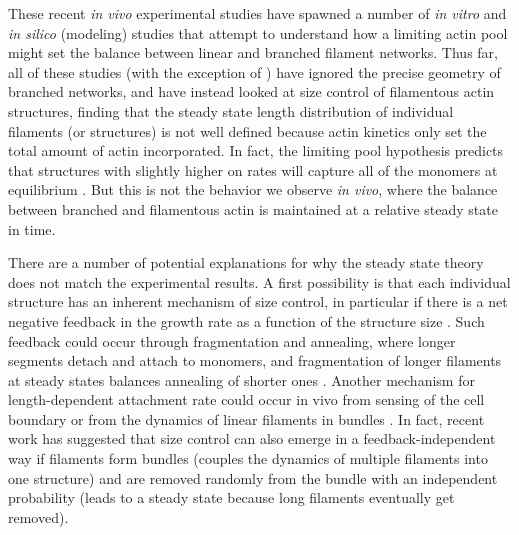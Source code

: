\documentclass[11pt]{article}
\begin{document}
These recent \emph{in vivo} experimental studies have spawned a number of \emph{in vitro} and \emph{in silico} (modeling) studies that attempt to understand how a limiting actin pool might set the balance between linear and branched filament networks. Thus far, all of these studies (with the exception of \cite{ni2019turnover}) have ignored the precise geometry of branched networks, and have instead looked at size control of filamentous actin structures, finding that the steady state length distribution of individual filaments (or structures) is not well defined \cite{mohapatra2017limiting,harbage2016exact} because actin kinetics only set the total amount of actin incorporated. In fact, the limiting pool hypothesis predicts that structures with slightly higher on rates will capture all of the monomers at equilibrium \cite{mohapatra2017limiting}. But this is not the behavior we observe \emph{in vivo}, where the balance between branched and filamentous actin is maintained at a relative steady state in time. 

There are a number of potential explanations for why the steady state theory does not match the experimental results. A first possibility is that each individual structure has an inherent mechanism of size control, in particular if there is a net negative feedback in the growth rate as a function of the structure size  \cite{banerjee2022size}. Such feedback could occur through fragmentation and annealing, where longer segments detach and attach to monomers, and fragmentation of longer filaments at steady states balances annealing of shorter ones \cite{fass2008stochastic}. Another mechanism for length-dependent attachment rate could occur in vivo from sensing of the cell boundary \cite{mcinally2021scaling} or from the dynamics of linear filaments in bundles \cite{rosario2023universal}. In fact, recent work \cite{mcinally2023length} has suggested that size control can also emerge in a feedback-independent way if filaments form bundles (couples the dynamics of multiple filaments into one structure) and are removed randomly from the bundle with an independent probability (leads to a steady state because long filaments eventually get removed). 
\end{document}
